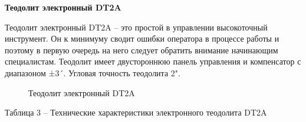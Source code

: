 \documentclass[a4paper]{article}
\begin{document}
\begin{newpage}
    
    \begin{center}
        \textbf{Теодолит электронный DT2A}
    \end{center}
    
    \par Теодолит электронный DT2A – это простой в управлении высокоточный  инструмент. Он к минимуму сводит ошибки оператора в процессе работы и поэтому в первую очередь на него следует обратить внимание начинающим специалистам. Теодолит имеет двустороннюю панель управления и компенсатор с диапазоном ±3´. Угловая точность теодолита 2".

    \begin{figure}[h]
        \caption{Теодолит электронный DT2A}
        \label{fig:image}
    \end{figure}
    
    \begin{center}
        \begin{flushleft}
            Таблица 3 – Технические характеристики электронного теодолита DT2A
        \end{flushleft}
        

\end{center}
\end{newpage}
\end{document}
